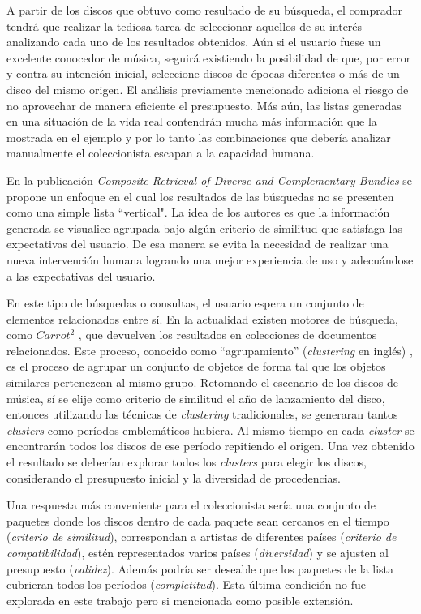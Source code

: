 A partir de los discos que obtuvo como resultado de su búsqueda, el comprador tendrá que realizar la tediosa tarea de seleccionar aquellos de su interés analizando cada uno de los resultados obtenidos. Aún si el usuario fuese un excelente conocedor de música, seguirá existiendo la posibilidad de que, por error y contra su intención inicial, seleccione discos de épocas diferentes o más de un disco del mismo origen. El análisis previamente mencionado adiciona el riesgo de no aprovechar de manera eficiente el presupuesto. Más aún, las listas generadas en una situación de la vida real contendrán mucha más información que la mostrada en el ejemplo y por lo tanto las combinaciones que debería analizar manualmente el coleccionista escapan a la capacidad humana. 

En la publicación {\em Composite Retrieval of Diverse and Complementary Bundles} \cite{journals/tkde/Amer-YahiaBCFMZ14} se propone un enfoque en el cual los resultados de las búsquedas no se presenten como una simple lista ``vertical". La idea de los autores es que la información generada se visualice agrupada bajo algún criterio de similitud que satisfaga las expectativas del usuario. De esa manera se evita la necesidad de realizar una nueva intervención humana logrando una mejor experiencia de uso y adecuándose a las expectativas del usuario.

En este tipo de búsquedas o consultas, el usuario espera un conjunto de elementos relacionados entre sí. En la actualidad existen motores de búsqueda, como $Carrot^{2}$ \cite{url:carrot}, que devuelven los resultados en colecciones de documentos relacionados. Este proceso, conocido como ``agrupamiento'' (\textit{clustering} en inglés) \cite{wiki:clustering}, es el proceso de agrupar un conjunto de objetos de forma tal que los objetos similares pertenezcan al mismo grupo. Retomando el escenario de los discos de música, sí se elije como criterio de similitud el año de lanzamiento del disco, entonces utilizando las técnicas de {\em clustering} tradicionales, se generaran tantos {\em clusters} como períodos emblemáticos hubiera. Al mismo tiempo en cada {\em cluster} se encontrarán todos los discos de ese período repitiendo el origen. Una vez obtenido el resultado se deberían explorar todos los {\em clusters} para elegir los discos, considerando el presupuesto inicial y la diversidad de procedencias.

Una respuesta más conveniente para el coleccionista sería una conjunto de paquetes donde los discos dentro de cada paquete sean cercanos en el tiempo ({\em criterio de similitud}), correspondan a artistas de diferentes países ({\em criterio de compatibilidad}), estén representados varios países ({\em diversidad}) y se ajusten al presupuesto ({\em validez}). Además podría ser deseable que los paquetes de la lista cubrieran todos los períodos ({\em completitud}). Esta última condición no fue explorada en este trabajo pero si mencionada como posible extensión.

